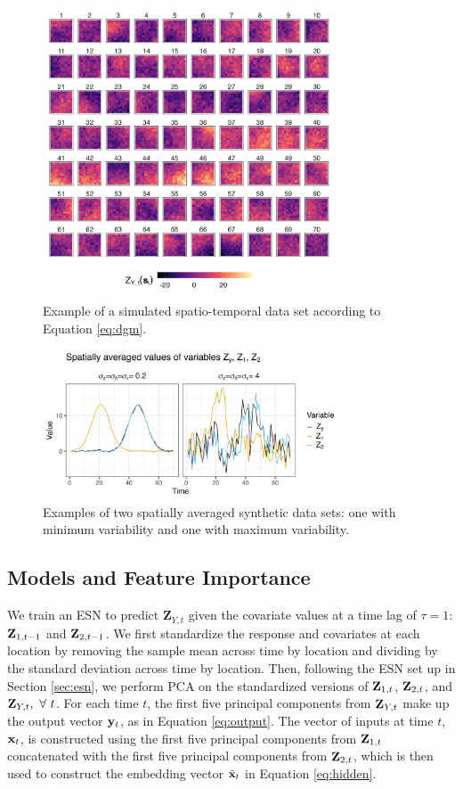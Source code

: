 \documentclass[AMS,STIX2COL]{WileyNJD-v2}
\begin{document}
\begin{figure}[h]
    \centering
    \includegraphics[width=3.4in]{figures/simulation_heatmaps.png}
    \caption{Example of a simulated spatio-temporal data set according to Equation \eqref{eq:dgm}.}
    \label{fig:simulated-data}
\end{figure}

\begin{figure}[h]
    \centering
    \includegraphics[width=3.5in]{figures/simulation_spatially_averaged.png}
    \caption{Examples of two spatially averaged synthetic data sets: one with minimum variability and one with maximum variability. }
    \label{fig:spatially-avg-simulated-data}
\end{figure}

\subsection{Models and Feature Importance}

We train an ESN to predict $\textbf{Z}_{Y,t}$ given the covariate values at a time lag of $\tau=1$: ${\bf Z}_{1,t-1}$ and ${\bf Z}_{2,t-1}$. We first standardize the response and covariates at each location by removing the sample mean across time by location and dividing by the standard deviation across time by location. Then, following the ESN set up in Section \ref{sec:esn}, we perform PCA on the standardized versions of ${\bf Z}_{1,t}$,  ${\bf Z}_{2,t}$, and  ${\bf Z}_{Y,t}, \ \forall \ t$. For each time $t$, the first five principal components from ${\bf Z}_{Y,t}$ make up the output vector ${\bf y}_t$, as in Equation \eqref{eq:output}. The vector of inputs at time $t$, ${\bf x}_t$, is constructed using the first five principal components from ${\bf Z}_{1,t}$ concatenated with the first five principal components from ${\bf Z}_{2,t}$, which is then used to construct the embedding vector $\tilde{{\bf x}}_t$ in Equation \eqref{eq:hidden}.
\end{document}
